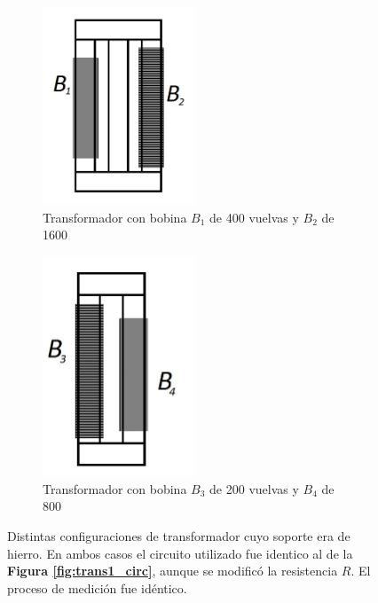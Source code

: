 \documentclass[11pt,a4paper]{article}
\begin{document}
\begin{figure}[h!]
   \begin{subfigure}{0.5\textwidth}
      \centering
      \includegraphics[width=0.5\textwidth]{configuracion1}
      \caption{Transformador con bobina $B_1$ de 400 vuelvas y $B_2$ de 1600}  
      \label{subfig:con1}
   \end{subfigure}
   \begin{subfigure}{0.5\textwidth}
      \centering
      \includegraphics[width=0.5\textwidth]{configuracion2}
      \caption{Transformador con bobina $B_3$ de 200 vuelvas y $B_4$ de 800}  
      \label{subfig:con2}
   \end{subfigure}
   \caption{Distintas configuraciones de transformador cuyo soporte era de hierro. En ambos casos el circuito utilizado fue identico al de la \textbf{Figura \ref{fig:trans1_circ}}, aunque se modificó la resistencia $R$. El proceso de medición fue idéntico.}
   \label{fig:configs}
\end{figure}
\end{document}
